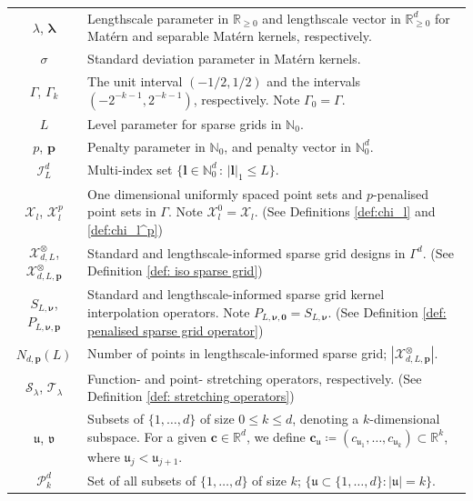 \documentclass[pdflatex,sn-mathphys-num]{sn-jnl}%
\theoremstyle{thmstyleone}%
\theoremstyle{thmstyletwo}%
\theoremstyle{thmstylethree}%
\begin{document}
\begin{center}
\begin{longtable}{|c|p{}|}
    \(\lambda\), \(\boldsymbol{\lambda}\) & Lengthscale parameter in \(\mathbb{R}_{\geq0}\) and lengthscale vector in \(\mathbb{R}_{\geq0}^d\) for Mat\'ern and separable Mat\'ern kernels, respectively.\\
    \(\sigma\) & Standard deviation parameter in Mat\'ern kernels.\\
    \(\Gamma\), \(\Gamma_k\) & The unit interval \(\left(-1/2,1/2\right)\) and the intervals \(\left(-2^{-k-1},2^{-k-1}\right)\), respectively. Note \(\Gamma_0=\Gamma\).\\
    \(L\) & Level parameter for sparse grids in \(\mathbb{N}_0\).\\
    \(p\), \(\mathbf{p}\) & Penalty parameter in \(\mathbb{N}_0\), and penalty vector in \(\mathbb{N}_0^d\).\\
    \(\mathcal{I}_L^d\) & Multi-index set \(\{\boldsymbol{l}\in\mathbb{N}_0^d\,:\,|\boldsymbol{l}|_1\leq L\}\).\\
    \(\mathcal{X}_l\), \(\mathcal{X}_l^p\) & One dimensional uniformly spaced point sets and \(p\)-penalised point sets in \(\Gamma\). Note \(\mathcal{X}_l^0 = \mathcal{X}_l\). (See Definitions \ref{def:chi_l} and \ref{def:chi_l^p})\\
    \(\mathcal{X}^{\otimes}_{d,L}\), \(\mathcal{X}^\otimes_{d,L,\mathbf{p}}\) & Standard and lengthscale-informed sparse grid designs in \(\Gamma^d\). (See Definition \ref{def: iso sparse grid})\\
    \(S_{L,\boldsymbol{\nu}}\), \(P_{L,\boldsymbol{\nu},\mathbf{p}}\) & Standard and lengthscale-informed sparse grid kernel interpolation operators. Note \(P_{L,\boldsymbol{\nu},\mathbf{0}}=S_{L,\boldsymbol{\nu}}\). (See Definition \ref{def: penalised sparse grid operator})\\
    \(N_{d,\mathbf{p}}(L)\) & Number of points in lengthscale-informed sparse grid; 
    \(|\mathcal{X}^\otimes_{d,L,\mathbf{p}}|\).\\
    \(\mathcal{S}_\lambda\), \(\mathcal{T}_\lambda\) & Function- and point- stretching operators, respectively. (See Definition \ref{def: stretching operators})\\
    \(\mathfrak{u}\), \(\mathfrak{v}\) & Subsets of \(\{1,\dots,d\}\) of size \(0\leq k\leq d\), denoting a \(k\)-dimensional subspace. For a given \(\mathbf{c}\in\mathbb{R}^d\), we define \(\mathbf{c}_{\mathfrak{u}}\coloneqq(c_{\mathfrak{u}_1},\dots,c_{\mathfrak{u}_k})\subset\mathbb{R}^k\), where \(\mathfrak{u}_j<\mathfrak{u}_{j+1}\).\\
    \(\mathcal{P}^d_k\) & Set of all subsets of \(\{1,\dots,d\}\) of size \(k\); \(\{\mathfrak{u}\subset\{1,\dots,d\}:|\mathfrak{u}|=k\}\).\\
    \hline
    
\end{longtable}
\end{center}
\end{document}
